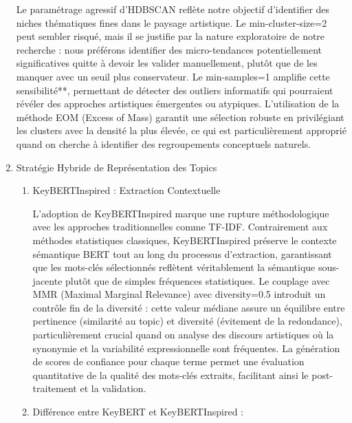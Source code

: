 \documentclass[mstat,12pt]{unswthesis}
\begin{document}
\begin{enumerate}
    \bigskip

    Le paramétrage agressif d'HDBSCAN reflète notre objectif d'identifier des niches
    thématiques fines dans le paysage artistique. Le min-cluster-size=2 peut sembler risqué,
    mais il se justifie par la nature exploratoire de notre recherche : nous préférons identifier
    des micro-tendances potentiellement significatives quitte à devoir les valider manuellement,
    plutôt que de les manquer avec un seuil plus conservateur. Le min-samples=1 amplifie cette
    sensibilité**, permettant de détecter des outliers informatifs qui pourraient révéler des
    approches artistiques émergentes ou atypiques. L'utilisation de la méthode EOM (Excess of
    Mass) garantit une sélection robuste en privilégiant les clusters avec la densité la plus
    élevée, ce qui est particulièrement approprié quand on cherche à identifier des
    regroupements conceptuels naturels.

    \bigskip

    \item Stratégie Hybride de Représentation des Topics

    \bigskip

    \begin{enumerate}
        \item KeyBERTInspired : Extraction Contextuelle

        \bigskip

        L'adoption de KeyBERTInspired marque une rupture méthodologique avec les approches traditionnelles comme TF-IDF. Contrairement aux méthodes statistiques classiques, KeyBERTInspired préserve le contexte sémantique BERT tout au long du processus d'extraction, garantissant que les mots-clés sélectionnés reflètent véritablement la sémantique sous-jacente plutôt que de simples fréquences statistiques. Le couplage avec MMR (Maximal Marginal Relevance) avec diversity=0.5 introduit un contrôle fin de la diversité : cette valeur médiane assure un équilibre entre pertinence (similarité au topic) et diversité (évitement de la redondance), particulièrement crucial quand on analyse des discours artistiques où la synonymie et la variabilité expressionnelle sont fréquentes. La génération de scores de confiance pour chaque terme permet une évaluation quantitative de la qualité des mots-clés extraits, facilitant ainsi le post-traitement et la validation.

        \bigskip

        \item Différence entre KeyBERT et KeyBERTInspired :


\end{enumerate}
\end{enumerate}
\end{document}
